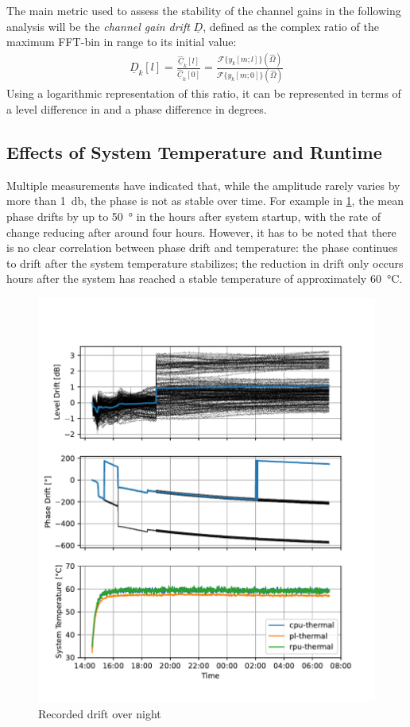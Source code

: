 The main metric used to assess the stability of the channel gains in the following analysis
will be the \emph{channel gain drift} $\underline D$, defined as the complex ratio of the maximum FFT-bin in range to its initial value:
\begin{align}
    \underline D_k[l] = \frac{\underline{\hat C}_k[l]}{\underline{\hat C}_k[0]}
    = \frac{\mathcal{F}\{y_{k}[m;l]\}(\hat\Omega)}{\mathcal{F}\{y_{k}[m;0]\}(\hat\Omega)}
\end{align}
Using a logarithmic representation of this ratio,
it can be represented in terms of a level difference in \unit{\dBr} and a phase difference in degrees.

\newpage
\subsection{Effects of System Temperature and Runtime}

Multiple measurements have indicated that, while the amplitude rarely varies by more than \SI{1}{\decibel},
the phase is not as stable over time.
For example in \cref{fig:weekend}, the mean phase drifts by up to \SI{50}{\degree} in the hours after system startup,
with the rate of change reducing after around four hours.
However, it has to be noted that there is no clear correlation between phase drift and temperature:
the phase continues to drift after the system temperature stabilizes;
the reduction in drift only occurs hours after the system has reached a stable temperature of approximately \SI{60}{\celsius}.
\begin{figure}
    \centering
    \includegraphics[width=\textwidth]{../figures/meas_23-10-09_phase_drift.pdf}
    \caption{Recorded drift over night}
    \label{fig:weekend}
\end{figure}



